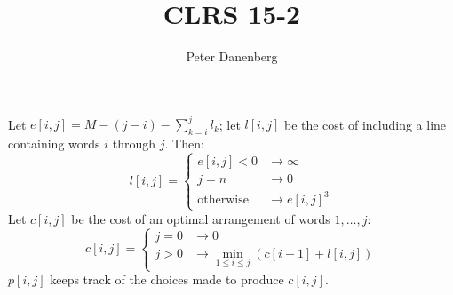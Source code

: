 \documentclass{article}
\title{CLRS 15-2}
\author{Peter Danenberg}
\begin{document}
\maketitle

Let $e[i,j] = M - (j - i) - \sum_{k=i}^jl_k$; let $l[i,j]$ be the cost
of including a line containing words $i$ through $j$. Then:
\[l[i,j]=\left\{
  \begin{aligned}
    e[i,j]<0 &\to \infty\\
    j=n &\to 0\\
    \text{otherwise} &\to e[i,j]^3
  \end{aligned}
  \right.\]
Let $c[i,j]$ be the cost of an optimal arrangement of words $1,\dots,j$:
\[c[i,j]=\left\{
  \begin{aligned}
    j=0&\to0\\
    j>0&\to\min_{1\leq i\leq j}(c[i-1]+l[i,j])
  \end{aligned}
  \right.\]
$p[i,j]$ keeps track of the choices made to produce $c[i,j]$.
\end{document}
